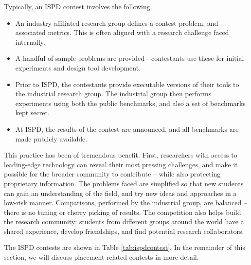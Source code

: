 \documentclass[sigconf]{acmart}
\begin{document}
Typically, an ISPD contest involves the following.
\begin{itemize}
\item An industry-affiliated research group defines a contest
  problem, and associated metrics.  This is often aligned with
  a research challenge faced internally.
\item A handful of sample problems are provided - contestants
  use these for initial experiments and design tool development.
\item Prior to ISPD, the contestants provide executable versions
  of their tools to the industrial research group. The industrial
  group then
  performs experiments using both the public benchmarks, and
  also a set of benchmarks kept secret.
\item At ISPD, the results of the contest are announced, and all
  benchmarks are made publicly available.
\end{itemize}

This practice has been of tremendous benefit.  First, researchers with
access to leading-edge technology can reveal their most pressing
challenges, and make it possible for the broader community to
contribute -- while also protecting proprietary information.  The
problems faced are simplified so that new students can gain an
understanding of the field, and try new ideas and approaches in a
low-risk manner.  Comparisons, performed by the industrial group, are
balanced -- there is no tuning or cherry picking of results.  The
competition also helps build the research community; students from
different groups around the world have a shared experience, develop
friendships, and find potential research collaborators.


The ISPD contests are shown in Table \ref{tab:ispdcontest}.
In the remainder of this section, we will discuss placement-related
contests in more detail.
\end{document}
